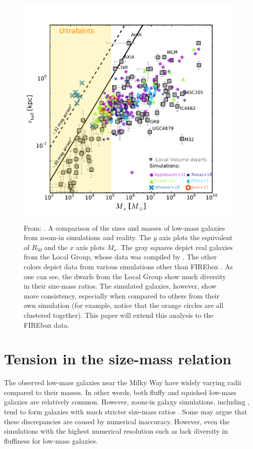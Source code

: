 \begin{figure}
    \centering
    \includegraphics*[width=\textwidth*2/3]{figs/sales/fig4.pdf}
    \label{fig:sales-size-mass}
    \caption{
        From: \cite{salesBaryonicSolutionsChallenges2022}. A comparison of the sizes and masses of low-mass galaxies from zoom-in simulations and reality. The $y$ axis plots the equivalent of $R_{50}$ and the $x$ axis plots $M_\star$. The gray squares depict real galaxies from the Local Group, whose data was compiled by \cite{mcconnachieOBSERVEDPROPERTIESDWARF2012}. The other colors depict data from various simulations other than FIREbox \citep[refer to][]{salesBaryonicSolutionsChallenges2022}. As one can see, the dwarfs from the Local Group show much diversity in their size-mass ratios. The simulated galaxies, however, show more consistency, especially when compared to others from their own simulation (for example, notice that the orange circles are all clustered together). This paper will extend this analysis to the FIREbox data.
    }
\end{figure}


\section{Tension in the size-mass relation}

The observed low-mass galaxies near the Milky Way have widely varying radii compared to their masses. In other words, both fluffy and squished low-mass galaxies are relatively common. However, zoom-in galaxy simulations, including \cite{fittsFireFieldSimulating2017}, tend to form galaxies with much stricter size-mass ratios \citep{salesBaryonicSolutionsChallenges2022}. Some may argue that these discrepancies are caused by numerical inaccuracy. However, even the simulations with the highest numerical resolution such as \cite{wheelerBeItTherefore2019} lack diversity in fluffiness for low-mass galaxies. 

